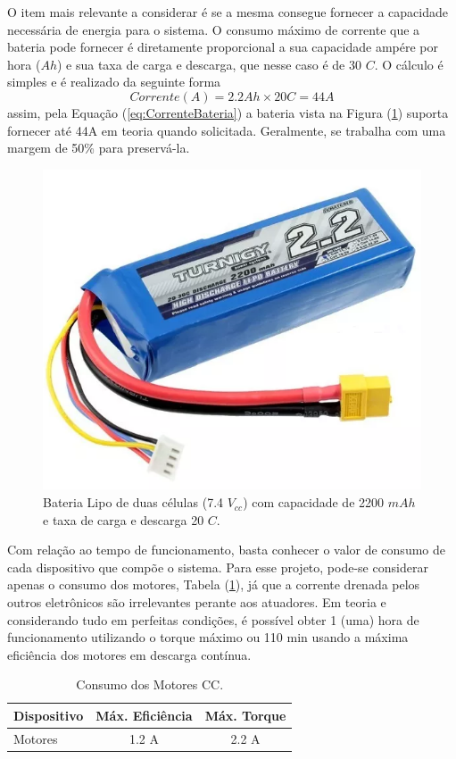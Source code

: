 O item mais relevante a considerar é se a mesma consegue fornecer a capacidade necessária de energia para o sistema. O consumo máximo de corrente que a bateria pode fornecer é diretamente proporcional a sua capacidade ampére por hora ($Ah$) e sua taxa de carga e descarga, que nesse caso é de 30 $C$. O cálculo é simples e é realizado da seguinte forma
\begin{equation}\label{eq:CorrenteBateria}
    Corrente (A) = 2.2 Ah\times 20 C = 44 A
\end{equation}{}
assim, pela Equação (\ref{eq:CorrenteBateria}) a bateria vista na Figura (\ref{fig:Bateria2200}) suporta fornecer até 44A em teoria quando solicitada. Geralmente, se trabalha com uma margem de 50\% para preservá-la.
\begin{figure}[H]
    \centering
    \includegraphics[scale=0.5]{Metodologia/Bateria2200}
    \caption{Bateria Lipo de duas células (7.4 $V_{cc}$) com capacidade de 2200 $mAh$ e taxa de carga e descarga 20 $C$.}
    \label{fig:Bateria2200}
\end{figure}

Com relação ao tempo de funcionamento, basta conhecer o valor de consumo de cada dispositivo que compõe o sistema. Para esse projeto, pode-se considerar apenas o consumo dos motores, Tabela (\ref{tab:ConsumoMotores}), já que a corrente drenada pelos outros eletrônicos são irrelevantes perante aos atuadores. Em teoria e considerando tudo em perfeitas condições, é possível obter 1 (uma) hora de funcionamento utilizando o torque máximo ou 110 min usando a máxima eficiência dos motores em descarga contínua. 
\begin{table}[!htb]
\centering
\caption{Consumo dos Motores CC.}
\label{tab:ConsumoMotores}
\begin{tabular}{@{}lcc@{}}
\toprule
\multicolumn{1}{c}{\textbf{Dispositivo}} & \textbf{Máx. Eficiência} & \textbf{Máx. Torque} \\ \midrule
Motores                          & 1.2 A                     & 2.2 A                 \\ \bottomrule
\end{tabular}
\end{table}


